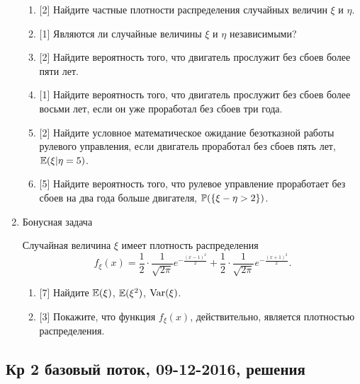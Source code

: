 \documentclass[12pt, a4paper]{article}\usepackage[]{graphicx}\usepackage[]{color}
\begin{document}
\begin{enumerate}
							\begin{enumerate}
								\item{} [2] Найдите частные плотности распределения случайных величин $\xi$ и $\eta$.
								\item{} [1] Являются ли случайные величины $\xi$ и $\eta$ независимыми?
								\item{} [2] Найдите вероятность того, что двигатель прослужит без сбоев более пяти лет.
								\item{} [1] Найдите вероятность того, что двигатель прослужит без сбоев более восьми лет, если он уже проработал без сбоев три года.
								\item{} [2] Найдите условное математическое ожидание безотказной работы рулевого управления, если двигатель проработал без сбоев пять лет,  $\E(\xi | \eta = 5)$.
								\item{} [5] Найдите вероятность того, что рулевое управление проработает без сбоев на два года больше двигателя,  $\P(\{\xi - \eta > 2\})$.
							\end{enumerate}

							\item Бонусная задача

							Случайная величина $\xi$ имеет плотность распределения
							\[
							f_{\xi}(x) = \frac{1}{2} \cdot \frac{1}{\sqrt{2\pi}}e^{-\frac{(x-1)^2}{2}} + \frac{1}{2} \cdot \frac{1}{\sqrt{2\pi}}e^{-\frac{(x+1)^2}{2}} \text{.}
							\]

							\begin{enumerate}
								\item{} [7] Найдите $\E(\xi)$, $\E(\xi^2)$, $\Var(\xi)$.
								\item{} [3] Покажите, что функция $f_{\xi}(x)$, действительно, является плотностью распределения.
							\end{enumerate}


						\end{enumerate}

						\subsection{Кр 2 базовый поток, 09-12-2016, решения}
\end{document}

